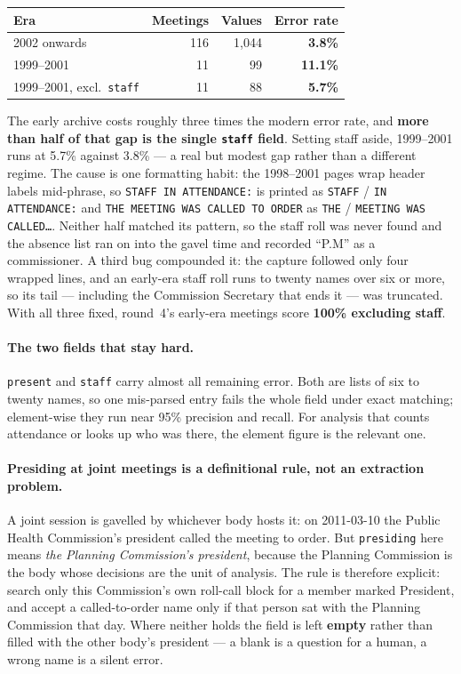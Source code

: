 \documentclass[11pt]{article}
\begin{document}
\begin{center}
\begin{tabular}{lrrr}
\toprule
Era & Meetings & Values & Error rate \\
\midrule
2002 onwards            & 116 & 1{,}044 & \textbf{3.8\%} \\
1999--2001              &  11 &     99 & \textbf{11.1\%} \\
1999--2001, excl.\ \texttt{staff} & 11 & 88 & \textbf{5.7\%} \\
\bottomrule
\end{tabular}
\end{center}

\noindent
The early archive costs roughly three times the modern error rate, and \textbf{more than
half of that gap is the single \texttt{staff} field}. Setting staff aside, 1999--2001 runs
at 5.7\% against 3.8\% --- a real but modest gap rather than a different regime. The cause
is one formatting habit: the 1998--2001 pages wrap header labels mid-phrase, so
\texttt{STAFF IN ATTENDANCE:} is printed as \texttt{STAFF} / \texttt{IN ATTENDANCE:} and
\texttt{THE MEETING WAS CALLED TO ORDER} as \texttt{THE} / \texttt{MEETING WAS CALLED\ldots}.
Neither half matched its pattern, so the staff roll was never found and the absence list ran
on into the gavel time and recorded ``P.M'' as a commissioner. A third bug compounded it:
the capture followed only four wrapped lines, and an early-era staff roll runs to twenty
names over six or more, so its tail --- including the Commission Secretary that ends it ---
was truncated. With all three fixed, round~4's early-era meetings score \textbf{100\%
excluding staff}.

\paragraph{The two fields that stay hard.} \texttt{present} and \texttt{staff} carry almost
all remaining error. Both are lists of six to twenty names, so one mis-parsed entry fails
the whole field under exact matching; element-wise they run near 95\% precision and recall.
For analysis that counts attendance or looks up who was there, the element figure is the
relevant one.

\paragraph{Presiding at joint meetings is a definitional rule, not an extraction problem.}
A joint session is gavelled by whichever body hosts it: on 2011-03-10 the Public Health
Commission's president called the meeting to order. But \texttt{presiding} here means
\emph{the Planning Commission's president}, because the Planning Commission is the body
whose decisions are the unit of analysis. The rule is therefore explicit: search only this
Commission's own roll-call block for a member marked President, and accept a called-to-order
name only if that person sat with the Planning Commission that day. Where neither holds the
field is left \textbf{empty} rather than filled with the other body's president --- a blank
is a question for a human, a wrong name is a silent error.
\end{document}
